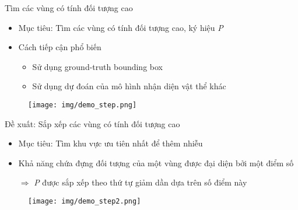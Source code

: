 \documentclass[aspectratio=169, 12pt]{beamer}
\begin{document}
\begin{frame}{Tìm các vùng có tính đối tượng cao}

\begin{minipage}{0.51\textwidth}
    \begin{itemize}
    
        \item Mục tiêu: Tìm các vùng có tính đối tượng cao, ký hiệu \textit{P}

        \item Cách tiếp cận phổ biến
        \begin{itemize}
            \item Sử dụng ground-truth bounding box
            \item Sử dụng dự đoán của mô hình nhận diện vật thể khác
        \end{itemize}
    
    \end{itemize}
\end{minipage}
%
\hfill
\begin{minipage}{0.46\textwidth}
\begin{figure}[h]
\texttt{[image: img/demo\_step.png]}
\end{figure}
\end{minipage}
    
\end{frame}


\begin{frame}{Đề xuất: Sắp xếp các vùng có tính đối tượng cao}

\begin{minipage}{0.51\textwidth}
\begin{itemize}

    \item Mục tiêu: Tìm khu vực ưu tiên nhất để thêm nhiễu
    \item Khả năng chứa đựng đối tượng của một vùng được đại diện bởi một điểm số
    
    $\Rightarrow$ \textit{P} được sắp xếp theo thứ tự giảm dần dựa trên số điểm này
    
\end{itemize}
\end{minipage}
%
\hfill
\begin{minipage}{0.46\textwidth}
\begin{figure}[h]
\texttt{[image: img/demo\_step2.png]}
\end{figure}
\end{minipage}

\end{frame}
\end{document}
